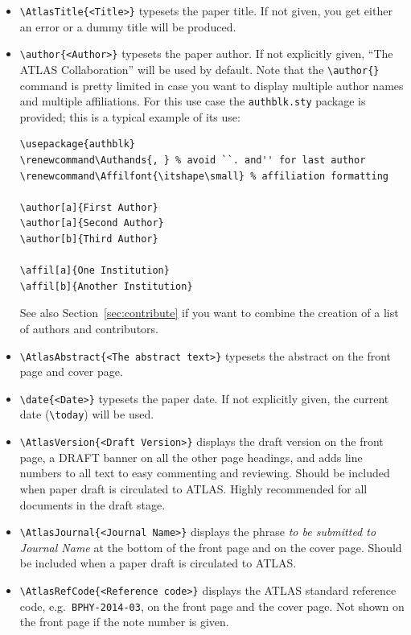 \begin{itemize}
  \item {\verb|\AtlasTitle{<Title>}|} typesets the paper title. If not
    given, you get either an error or a dummy title will be produced.

  \item {\verb|\author{<Author>}|} typesets the paper author. If not
    explicitly given, \enquote{The ATLAS Collaboration} will be used by
    default. Note that the \verb|\author{}| command is pretty limited
    in case you want to display multiple author names and multiple
    affiliations. For this use case the \verb|authblk.sty| package is
    provided; this is a typical example of its use:
    \begin{verbatim}
\usepackage{authblk}
\renewcommand\Authands{, } % avoid ``. and'' for last author
\renewcommand\Affilfont{\itshape\small} % affiliation formatting

\author[a]{First Author}
\author[a]{Second Author}
\author[b]{Third Author}

\affil[a]{One Institution}
\affil[b]{Another Institution}
    \end{verbatim}
    See also Section~\ref{sec:contribute} if you want to combine the creation of a list of authors and contributors.

  \item {\verb|\AtlasAbstract{<The abstract text>}|} typesets the
    abstract on the front page and cover page.

  \item {\verb|\date{<Date>}|} typesets the paper date. If not
    explicitly given, the current date (\verb|\today|) will be used.

  \item {\verb|\AtlasVersion{<Draft Version>}|} displays the draft
    version on the front page, a DRAFT banner on all the other page
    headings, and adds line numbers to all text to easy commenting and
    reviewing.
    Should be included when paper draft is circulated to ATLAS.
    Highly recommended for all documents in the draft stage.

  \item {\verb|\AtlasJournal{<Journal Name>}|} displays the phrase \emph{to
    be submitted to Journal Name} at the bottom of the front page and
    on the cover page.
    Should be included when a paper draft is circulated to ATLAS.

  \item {\verb|\AtlasRefCode{<Reference code>}|} displays the ATLAS
    standard reference code, e.g.\ \texttt{BPHY-2014-03}, on the front page and
    the cover page. Not shown on the front page if the note number is given.


\end{itemize}
